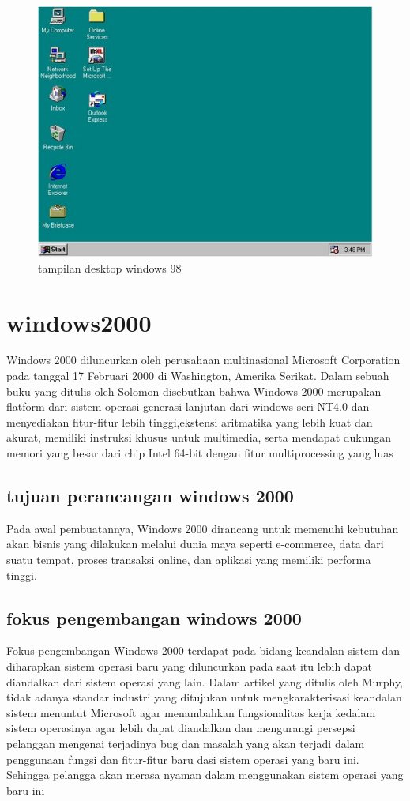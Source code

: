 		\begin{figure}[ht]
		\centerline{\includegraphics[width=1\textwidth]{figures/Desktopwindows98.JPG}}
		\caption{tampilan desktop windows 98}
		\label{Desktopwindows98}
		\end{figure}

\section{windows2000}
	Windows 2000 diluncurkan oleh perusahaan multinasional Microsoft Corporation pada tanggal 17 Februari 2000 di Washington, Amerika Serikat. 
	Dalam sebuah buku yang ditulis oleh Solomon disebutkan bahwa Windows 2000 merupakan flatform dari sistem operasi generasi lanjutan dari windows seri NT4.0 dan menyediakan fitur-fitur lebih tinggi,ekstensi aritmatika yang lebih kuat dan akurat, memiliki instruksi khusus untuk multimedia, serta mendapat dukungan memori yang besar dari chip Intel 64-bit dengan fitur multiprocessing yang luas \cite{solomon2000inside}
	\subsection{tujuan perancangan windows 2000}
		Pada awal pembuatannya, Windows 2000 dirancang untuk memenuhi kebutuhan akan bisnis yang dilakukan melalui dunia maya seperti e-commerce, data dari suatu tempat, proses transaksi online, dan aplikasi yang memiliki performa tinggi.
	\subsection{fokus pengembangan windows 2000}
		Fokus pengembangan Windows 2000 terdapat pada bidang keandalan sistem dan diharapkan sistem operasi baru yang diluncurkan pada saat itu lebih dapat diandalkan dari sistem operasi yang lain.
		Dalam artikel yang ditulis oleh Murphy, tidak adanya standar industri yang ditujukan untuk mengkarakterisasi keandalan sistem menuntut Microsoft agar menambahkan fungsionalitas kerja kedalam sistem operasinya agar lebih dapat diandalkan dan mengurangi persepsi pelanggan mengenai terjadinya bug dan masalah yang akan terjadi dalam penggunaan fungsi dan fitur-fitur baru dasi sistem operasi yang baru ini. Sehingga pelangga akan merasa nyaman dalam menggunakan sistem operasi yang baru ini \cite{murphy2000windows} 


